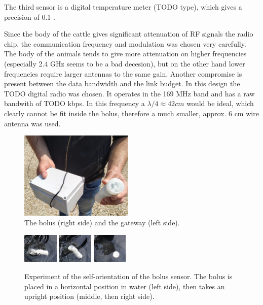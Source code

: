 \documentclass[conference]{IEEEtran}
\begin{document}
The third sensor is a digital temperature meter (TODO type), which gives
a precision of 0.1 \textcelsius.

Since the body of the cattle gives significant attenuation of RF signals
the radio chip, the communication frequency and modulation was chosen very
carefully. The body of the animals tends to give more attenuation on higher
frequencies (especially 2.4 GHz seems to be a bad decesion), but on the
other hand lower frequencies require larger antennas to the same gain.
Another compromise is present between the data bandwidth and the link budget.
In this design the TODO digital radio was chosen. It operates in the 169 MHz
band and has a raw bandwith of TODO kbps. In this frequency a
$\lambda / 4 \approx 42 cm$ would be ideal, which clearly cannot be fit
inside the bolus, therefore a much smaller, approx. 6 cm wire antenna
was used.

\begin{figure}[htbp]
\centerline{\includegraphics[width=0.48\textwidth]{fig/bolus_gw_photo.jpg}}
  \caption{The bolus (right side) and the gateway (left side).}
\label{bolus-gw-photo}
\end{figure}

\begin{figure}[htbp]
\centerline{
  \includegraphics[width=0.15\textwidth]{fig/kfj_1.png}
  \includegraphics[width=0.15\textwidth]{fig/kfj_2.png}
  \includegraphics[width=0.15\textwidth]{fig/kfj_3.png}
  }
  \caption{Experiment of the self-orientation of the bolus sensor. The
  bolus is placed in a horizontal position in water (left side), then takes
  an upright position (middle, then right side).}
\label{bolus-gw-photo}
\end{figure}
\end{document}
